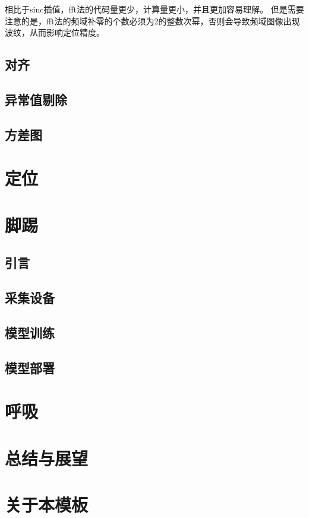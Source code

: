 相比于sinc插值，fft法的代码量更少，计算量更小，并且更加容易理解。
但是需要注意的是，fft法的频域补零的个数必须为2的整数次幂，否则会导致频域图像出现波纹，从而影响定位精度。


\section{对齐}
\section{异常值剔除}
\section{方差图}

\chapter{定位}

\chapter{脚踢}

\section{引言}
\section{采集设备}
\section{模型训练}
\section{模型部署}





\chapter{呼吸}

\chapter{总结与展望}

\chapter{关于本模板}

